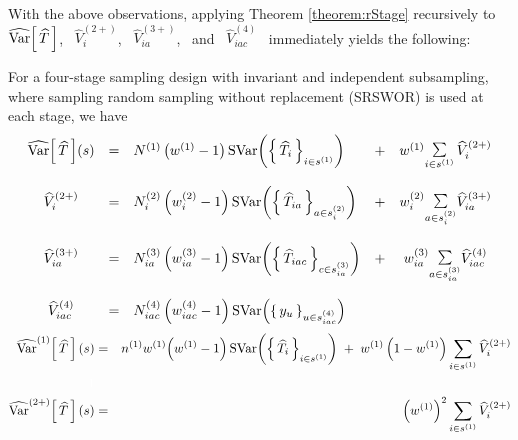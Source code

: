 With the above observations, applying Theorem \ref{theorem:rStage} recursively to
\, $\widehat{\textnormal{Var}}\!\left[\,\widehat{T}\,\right]$,
\, $\widehat{V}^{(2+)}_{i}$,
\, $\widehat{V}^{(3+)}_{ia}$,
\, and \, $\widehat{V}^{(4)}_{iac}$ \,
immediately yields the following:
\begin{corollary}\mbox{}\vskip 0.1cm
\noindent
For a four-stage sampling design with invariant and independent subsampling,
where sampling random sampling without replacement (SRSWOR) is used at each stage, we have
\begin{equation*}
\begin{array}{cclcc}
\widehat{\textnormal{Var}}\!\left[\,\widehat{T}\,\right]\!(s)
&=& N^{(1)} \left(w^{(1)}-1\right)\textnormal{SVar}\!\left(\left\{\,\widehat{T}_{i}\,\right\}_{i \in s^{(1)}}\right)
&+& w^{(1)}\underset{i\in s^{(1)}}{\textnormal{\Large$\sum$}}\,\widehat{V}^{(2+)}_{i}
\\ \\
\widehat{V}^{(2+)}_{i}
&=& N^{(2)}_{i} \left(w^{(2)}_{i}-1\right)\textnormal{SVar}\!\left(\left\{\,\widehat{T}_{ia}\,\right\}_{a\in s^{(2)}_{i}}\right)
&+& w^{(2)}_{i}\underset{a \in s^{(2)}_{i}}{\textnormal{\Large$\sum$}}\widehat{V}^{(3+)}_{ia}
\\ \\
\widehat{V}^{(3+)}_{ia}
&=& N^{(3)}_{ia} \left(w^{(3)}_{ia}-1\right)\textnormal{SVar}\!\left(\left\{\,\widehat{T}_{iac}\,\right\}_{c\in s^{(3)}_{ia}}\right)
&+& w^{(3)}_{ia}\underset{a \in s^{(3)}_{ia}}{\textnormal{\Large$\sum$}}\widehat{V}^{(4)}_{iac}
\\ \\
\widehat{V}^{(4)}_{iac}
&=& N^{(4)}_{iac} \left(w^{(4)}_{iac}-1\right) \textnormal{SVar}\!\left(\left\{\,y_{u}\,\right\}_{u \in s^{(4)}_{iac}}\right)
\end{array}
\end{equation*}
\begin{eqnarray*}
\widehat{\Var}^{(1)}\!\left[\,\widehat{T}\,\right](s)
&=& n^{(1)}w^{(1)}\!\left(w^{(1)}-1\right)\SVar\!\left(\left\{\,\widehat{T}_{i}\,\right\}_{i \in s^{(1)}}\right)
\;+\;w^{(1)}\left(1 - w^{(1)}\right)\underset{i\in s^{(1)}}{\sum}\,\widehat{V}^{(2+)}_{i}
\\ {\color{white}1} \\
\widehat{\Var}^{(2+)}\!\left[\,\widehat{T}\,\right](s)
&=& \left(w^{(1)}\right)^{2}\underset{i\in s^{(1)}}{\sum}\,\widehat{V}^{(2+)}_{i}
\end{eqnarray*}
\end{corollary}







